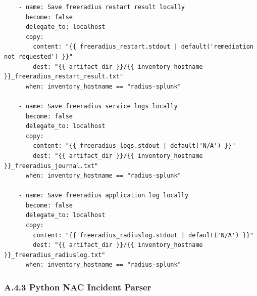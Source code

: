 \documentclass[11pt]{article}
\begin{document}
\begin{verbatim}
    - name: Save freeradius restart result locally
      become: false
      delegate_to: localhost
      copy:
        content: "{{ freeradius_restart.stdout | default('remediation not requested') }}"
        dest: "{{ artifact_dir }}/{{ inventory_hostname }}_freeradius_restart_result.txt"
      when: inventory_hostname == "radius-splunk"

    - name: Save freeradius service logs locally
      become: false
      delegate_to: localhost
      copy:
        content: "{{ freeradius_logs.stdout | default('N/A') }}"
        dest: "{{ artifact_dir }}/{{ inventory_hostname }}_freeradius_journal.txt"
      when: inventory_hostname == "radius-splunk"

    - name: Save freeradius application log locally
      become: false
      delegate_to: localhost
      copy:
        content: "{{ freeradius_radiuslog.stdout | default('N/A') }}"
        dest: "{{ artifact_dir }}/{{ inventory_hostname }}_freeradius_radiuslog.txt"
      when: inventory_hostname == "radius-splunk"
\end{verbatim}


\subsubsection{A.4.3 Python NAC Incident Parser}
\label{sec:appendix-a-python-nac-incident-parser}
\end{document}
